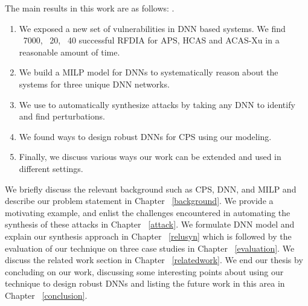 The main results in this work are as follows:
.
\begin{enumerate}
	\item We exposed a new set of vulnerabilities in \ac{DNN} based systems. 
	 We find ~7000, ~20, ~40 successful \ac{RFDIA} for \ac{APS}, \ac{HCAS} and \ac{ACAS-Xu} in a reasonable amount of time. 
	\item We build a \ac{MILP} model for \ac{DNN}s to systematically reason about the systems for three unique \ac{DNN} networks. 
	\item We use \tool to automatically synthesize attacks by taking any \ac{DNN} to identify and find perturbations. 
	\item We found ways to design robust \ac{DNN}s for \ac{CPS} using our modeling. 
	\item Finally, we discuss various ways our work can be extended and used in different settings. 
\end{enumerate}

	
We briefly discuss the relevant background such as \ac{CPS}, \ac{DNN}, and \ac{MILP} and describe our problem statement in Chapter ~\ref{background}.
We provide a motivating example, and enlist the challenges encountered in automating the synthesis of these attacks in Chapter ~\ref{attack}.
We formulate \ac{DNN} model and explain our synthesis approach in Chapter ~\ref{relusyn} which is followed by the evaluation of our technique on three case studies in Chapter ~\ref{evaluation}.
We discuss the related work section in Chapter ~\ref{relatedwork}.
We end our thesis by concluding on our work, discussing some interesting points about using our technique to design robust \ac{DNN}s and listing the future work in this area in Chapter ~\ref{conclusion}.









